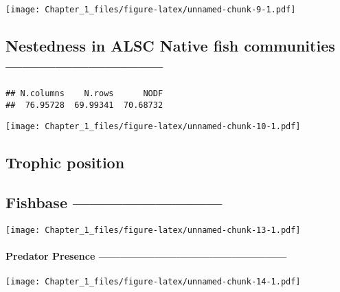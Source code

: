 \documentclass[
]{article}
\begin{document}
\texttt{[image: Chapter\_1\_files/figure-latex/unnamed-chunk-9-1.pdf]}

\hypertarget{nestedness-in-alsc-native-fish-communities}{%
\subsection{Nestedness in ALSC Native fish communities
-----------------------------}\label{nestedness-in-alsc-native-fish-communities}}

\begin{verbatim}
## N.columns    N.rows      NODF 
##  76.95728  69.99341  70.68732
\end{verbatim}

\texttt{[image: Chapter\_1\_files/figure-latex/unnamed-chunk-10-1.pdf]}

\hypertarget{trophic-position}{%
\subsection{Trophic position}\label{trophic-position}}

\hypertarget{fishbase}{%
\subsection{Fishbase ---------------------------}\label{fishbase}}

\texttt{[image: Chapter\_1\_files/figure-latex/unnamed-chunk-13-1.pdf]}

\hypertarget{predator-presence}{%
\paragraph{Predator Presence
---------------------------------------------------}\label{predator-presence}}

\texttt{[image: Chapter\_1\_files/figure-latex/unnamed-chunk-14-1.pdf]}
\end{document}
